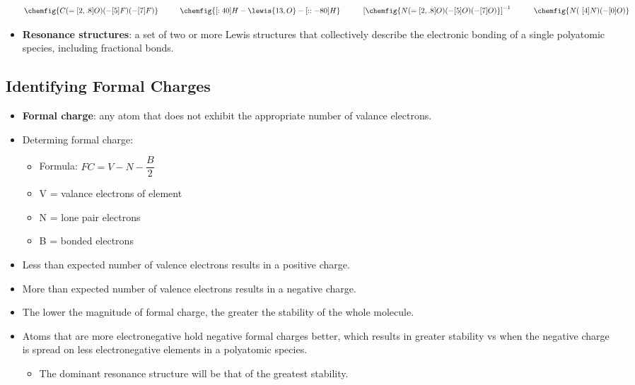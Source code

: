 \documentclass[12pt,a4paper]{article}
\begin{document}
\begin{itemize}
        \begin{align*}
            \chemfig{C(=[2,.8]O)(-[5]F)(-[7]F)}
            \hspace{1cm}
            \chemfig{[:40]H-\lewis{13,O}-[::-80]H} 
            \hspace{1cm}
            \left[\chemfig{N(=[2,.8]O)(-[5]O)(-[7]O)}\right]^{-1} 
            \hspace{1cm}
            \chemfig{N(~[4]N)(-[0]O)}
        \end{align*}
    \item \textbf{Resonance structures}: a set of two or more Lewis structures that collectively describe the electronic bonding of a single polyatomic species, including fractional bonds.
\end{itemize}

\subsection{Identifying Formal Charges}
\begin{itemize}
    \item \textbf{Formal charge}: any atom that does not exhibit the appropriate number of valance electrons.
    \item Determing formal charge:
        \begin{itemize}
            \item Formula: {\color{o-Sun}\(FC = V - N - \dfrac{B}{2}\)}
            \item V = valance electrons of element
            \item N = lone pair electrons
            \item B = bonded electrons
        \end{itemize}
    \item {\color{pos}Less} than expected number of valence electrons results in a {\color{pos} positive} charge.
    \item {\color{neg}More} than expected number of valence electrons results in a {\color{neg}negative} charge.
    \item The lower the {\color{o-Sun}magnitude} of formal charge, the {\color{o-Sun}greater the stability} of the whole molecule.
    \item Atoms that are {\color{neg}more electronegative} hold {\color{neg}negative} formal charges better, which results in {\color{o-Sun}greater stability} vs when the negative charge is spread on less electronegative elements in a polyatomic species.
        \begin{itemize}
            \item The dominant resonance structure will be that of the greatest stability. 
        \end{itemize}
\end{itemize}
\end{document}
